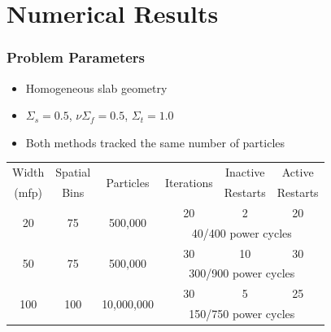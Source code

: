 \documentclass[color={usenames, dvipsnames},ignorenonframetext]{beamer}
\newlength\LL \settowidth\LL{100}
\begin{document}
\section{Numerical Results}
\begin{frame}
    \frametitle{Problem Parameters}
    \begin{itemize}
        \item Homogeneous slab geometry
        \item $\Sigma_s = 0.5$, $\nu\Sigma_f = 0.5$, $\Sigma_t = 1.0$
        \item Both methods tracked the same number of particles
    \end{itemize}

    \begin{table}[h]
        \centering
        \begin{tabular}{cccccc}
            \toprule
            Width & Spatial & \multirow{2}{10ex}{Particles} & \multirow{2}{10ex}{Iterations} & Inactive & Active \\
            (mfp) & Bins & & & Restarts & Restarts \\
            \midrule
            \multirow{2}{\LL}{20} & \multirow{2}{\LL}{75} & \multirow{2}{\LL}{500,000} & 20 & 2 & 20 \\
            & & & \multicolumn{3}{c}{40/400 power cycles} \\
            \midrule
            \multirow{2}{\LL}{50} & \multirow{2}{\LL}{75} & \multirow{2}{\LL}{500,000} & 30 & 10 & 30 \\
            & & & \multicolumn{3}{c}{300/900 power cycles} \\
            \midrule
            \multirow{2}{\LL}{100} & \multirow{2}{\LL}{100} & \multirow{2}{\LL}{10,000,000} & 30 & 5 & 25 \\
            & & & \multicolumn{3}{c}{150/750 power cycles} \\
            \bottomrule
        \end{tabular}
    \end{table}
\end{frame}
\end{document}

